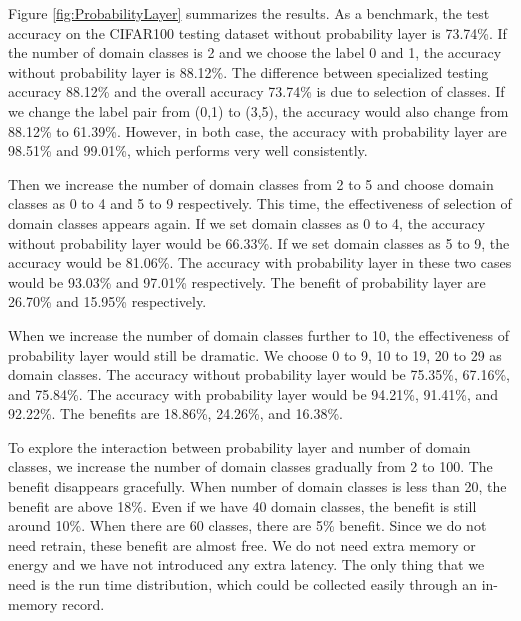 \documentclass{article}
\begin{document}
Figure \ref{fig:ProbabilityLayer} summarizes the results. As a benchmark, the test accuracy on the CIFAR100 testing dataset without probability layer is 73.74\%. If the number of domain classes is 2 and we choose the label 0 and 1, the accuracy without probability layer is 88.12\%. The difference between specialized testing accuracy 88.12\% and the overall accuracy 73.74\% is due to selection of classes. If we change the label pair from (0,1) to (3,5), the accuracy would also change from 88.12\% to 61.39\%. However, in both case, the accuracy with probability layer are 98.51\% and 99.01\%, which performs very well consistently. 

Then we increase the number of domain classes from 2 to 5 and choose domain classes as 0 to 4 and 5 to 9 respectively. This time, the effectiveness of selection of domain classes appears again. If we set domain classes as 0 to 4, the accuracy without probability layer would be 66.33\%. If we set domain classes as 5 to 9, the accuracy would be 81.06\%. The accuracy with probability layer in these two cases would be 93.03\% and 97.01\% respectively. The benefit of probability layer are 26.70\% and 15.95\% respectively.

When we increase the number of domain classes further to 10, the effectiveness of probability layer would still be dramatic. We choose 0 to 9, 10 to 19, 20 to 29 as domain classes. The accuracy without probability layer would be 75.35\%, 67.16\%, and 75.84\%. The accuracy with probability layer would be 94.21\%, 91.41\%, and 92.22\%. The benefits are 18.86\%, 24.26\%, and 16.38\%.

To explore the interaction between probability layer and number of domain classes, we increase the number of domain classes gradually from 2 to 100. The benefit disappears gracefully. When number of domain classes is less than 20, the benefit are above 18\%. Even if we have 40 domain classes, the benefit is still around 10\%. When there are 60 classes, there are 5\% benefit. Since we do not need retrain, these benefit are almost free. We do not need extra memory or energy and we have not introduced any extra latency. The only thing that we need is the run time distribution, which could be collected easily through an in-memory record.
\end{document}
